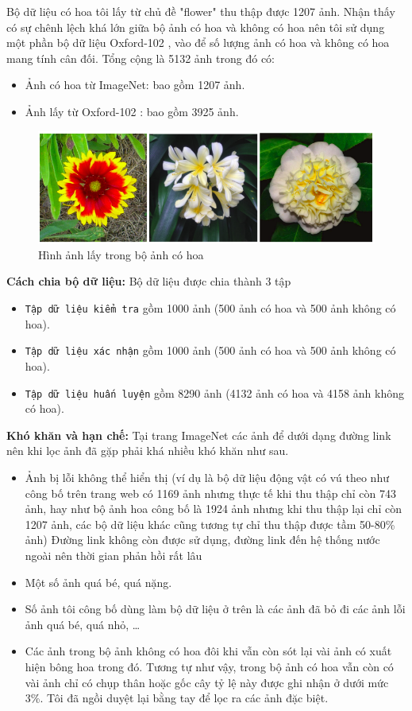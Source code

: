\documentclass[12pt]{report}
\begin{document}
		Bộ dữ liệu có hoa tôi lấy từ chủ đề "flower" thu thập được 1207 ảnh. Nhận thấy có sự chênh lệch khá lớn giữa bộ ảnh có hoa và không có hoa nên tôi sử dụng một phần bộ dữ liệu Oxford-102 \cite{cia-Nilsback06}, vào để số lượng ảnh có hoa và không có hoa mang tính cân đối. Tổng cộng là 5132 ảnh trong đó có:
		\begin{itemize}
			\item Ảnh có hoa từ ImageNet: bao gồm 1207 ảnh.
			\item Ảnh lấy từ Oxford-102	: bao gồm 3925 ảnh.
		\end{itemize}
								
		\begin{figure}[h]
			\centering
			\includegraphics[scale=0.6]{anhcohoa}
			\caption{Hình ảnh lấy trong bộ ảnh có hoa}
			\label{fig:anhcohoa}
		\end{figure}
								
		\textbf{Cách chia bộ dữ liệu:} Bộ dữ liệu được chia thành 3 tập
		\begin{itemize}
			\item \texttt{Tập dữ liệu kiểm tra} gồm 1000 ảnh (500 ảnh có hoa và 500 ảnh không có hoa).
			\item \texttt{Tập dữ liệu xác nhận} gồm 1000 ảnh (500 ảnh có hoa và 500 ảnh không có hoa).
			\item \texttt{Tập dữ liệu huấn luyện} gồm 8290 ảnh (4132 ảnh có hoa và 4158 ảnh không có hoa).
		\end{itemize}
								
								
		\textbf{Khó khăn và hạn chế:} Tại trang ImageNet các ảnh để dưới dạng đường link nên khi lọc ảnh đã gặp phải khá nhiều khó khăn như sau.
		\begin{itemize}
			\item Ảnh bị lỗi không thể hiển thị (ví dụ là bộ dữ liệu động vật có vú theo như công bố trên trang web có 1169 ảnh nhưng thực tế khi thu thập chỉ còn 743 ảnh, hay như bộ ảnh hoa công bố là 1924 ảnh nhưng khi thu thập lại chỉ còn 1207 ảnh, các bộ dữ liệu khác cũng tương tự chỉ thu thập được tầm 50-80\% ảnh) Đường link không còn được sử dụng, đường link đến hệ thống nước ngoài nên thời gian phản hồi rất lâu
			\item Một số ảnh quá bé, quá nặng.
			\item Số ảnh tôi công bố dùng làm bộ dữ liệu ở trên là các ảnh đã bỏ đi các ảnh lỗi ảnh quá bé, quá nhỏ, …
			\item Các ảnh trong bộ ảnh không có hoa đôi khi vẫn còn sót lại vài ảnh có xuất hiện bông hoa trong đó. Tương tự như vậy, trong bộ ảnh có hoa vẫn còn có vài ảnh chỉ có chụp thân hoặc gốc cây tỷ lệ này được ghi nhận ở dưới mức 3\%. 
			Tôi đã ngồi duyệt lại bằng tay để lọc ra các ảnh đặc biệt.
		\end{itemize}
								
\end{document}
